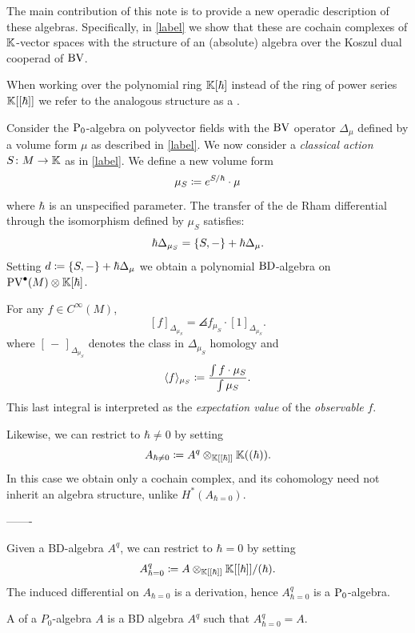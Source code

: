 The main contribution of this note is to provide a new operadic description of these algebras.
Specifically, in \cref{label} we show that these are cochain complexes of \(\mathbb{K}\)-vector spaces with the structure of an (absolute) algebra over the Koszul dual cooperad of \(\mathrm{BV}\).


\medskip When working over the polynomial ring \(\mathbb{K}[\hbar]\) instead of the ring of power series \(\mathbb{K}[[\hbar]]\) we refer to the analogous structure as a .

\begin{example}
	Consider the \(\mathrm{P}_0\)-algebra on polyvector fields with the \(\mathrm{BV}\) operator \(\Delta_\mu\) defined by a volume form \(\mu\) as described in \cref{label}.
	We now consider a \textit{classical action} \(S \colon M \to \mathbb{K}\) as in \cref{label}.
	We define a new volume form
	\[
	\mu_S \coloneqq e^{S/\hbar} \cdot \mu
	\]
	where \(\hbar\) is an unspecified parameter.
	The transfer of the de Rham differential through the isomorphism defined by \(\mu_S\) satisfies:
	\[
	\hbar\Delta_{\mu_S} =
	\{S, -\} + \hbar\Delta_\mu.
	\]
	Setting \(d \coloneqq \{S, -\} + \hbar\Delta_\mu\) we obtain a polynomial \(\mathrm{BD}\)-algebra on \(\mathrm{PV}^\bullet(M) \otimes \mathbb{K}[\hbar]\).


	For any \(f \in C^\infty(M)\),
	\[
	[f]_{\Delta_{\mu_S}} = \angles{f}_{\mu_S} \cdot [1]_{\Delta_{\mu_S}}.
	\]
	where \([\,-\,]_{\Delta_{\mu_S}}\) denotes the class in \(\Delta_{\mu_S}\) homology and
	\[
	\langle f\rangle_{\mu_S} \coloneqq
	\frac{\int f \cdot \mu_S}{\int \mu_S}.
	\]
	This last integral is interpreted as the \textit{expectation value} of the \textit{observable} \(f\).
\end{example}

Likewise, we can restrict to \(\hbar\neq 0\) by setting
\[
A_{\hbar\neq 0}\coloneqq A^q\otimes_{\mathbb{K}[[\hbar]]}\mathbb{K}((\hbar)).
\]
In this case we obtain only a cochain complex, and its cohomology need not inherit an algebra structure, unlike \(H^*(A_{\hbar=0})\).


\noindent-------

\medskip\noindent Given a BD-algebra \(A^q\), we can restrict to \(\hbar = 0\) by setting
\[
A^q_{\hbar=0} \coloneqq A \otimes_{\mathbb{K}[[\hbar]]}\mathbb{K}[[\hbar]]/(\hbar).
\]
The induced differential on \(A_{\hbar = 0}\) is a derivation, hence \(A^q_{\hbar = 0}\) is a \(\mathrm{P}_0\)-algebra.

\medskip\noindent A  of a \(P_0\)-algebra \(A\) is a BD algebra \(A^q\) such that \(A^q_{\hbar=0} = A\).



